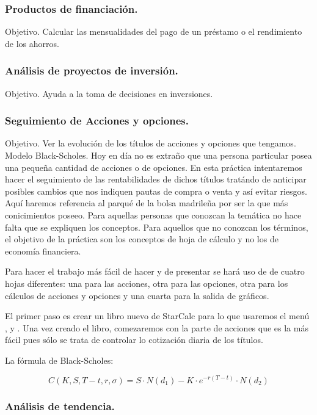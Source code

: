\subsubsection{Productos de financiación.}
Objetivo. Calcular las mensualidades del pago de un préstamo o el
rendimiento de los ahorros.

\subsubsection{Análisis de proyectos de inversión.}
Objetivo. Ayuda a la toma de decisiones en inversiones.

\subsubsection{Seguimiento de Acciones y opciones.}
Objetivo. Ver la evolución de los títulos de acciones y opciones que
tengamos. Modelo Black-Scholes.
Hoy en día no es extraño que una persona particular posea una pequeña cantidad
de acciones o de opciones. En esta práctica intentaremos hacer el seguimiento
de las rentabilidades de dichos títulos tratándo de anticipar posibles
cambios que nos indiquen pautas de compra o venta y así evitar riesgos. Aquí
haremos referencia al parqué de la bolsa madrileña por ser la que más
conicimientos poseeo. Para aquellas personas que conozcan la temática no
hace falta que se expliquen los conceptos. Para aquellos que no conozcan
los términos, el objetivo de la práctica son los conceptos de hoja de cálculo
y no los de economía financiera.

Para hacer el trabajo más fácil de hacer y de presentar se hará uso de
de cuatro hojas diferentes: una para las acciones, otra para las opciones,
otra para los cálculos de acciones y opciones y una cuarta para la salida
de gráficos.

El primer paso es crear un libro nuevo de StarCalc para lo que usaremos
el menú ,  y . Una vez
creado el libro, comezaremos con la parte de acciones que es la más
fácil pues sólo se trata de controlar lo cotización diaria de los títulos.

La fórmula de Black-Scholes:

\begin{displaymath}
C(K,S,T-t,r,\sigma)=S·N(d_{1})-K·e^{-r(T-t)}·N(d_{2})
\end{displaymath}


\subsubsection{Análisis de tendencia.}

